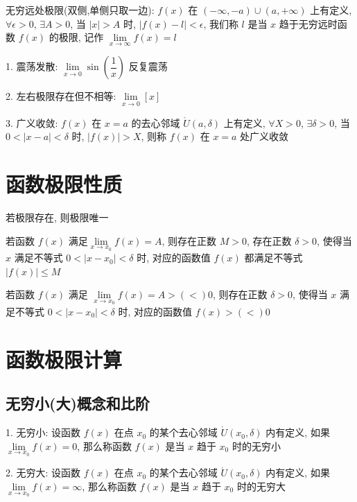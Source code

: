 \begin{definition}[无穷远极限]
	无穷远处极限(双侧,单侧只取一边): $f(x)$ 在 $(-\infty,-a)\cup(a,+\infty)$ 上有定义, $\forall \epsilon>0$, $\exists A>0$, 当 $|x|>A$ 时, $|f(x)-l|<\epsilon$, 我们称 $l$ 是当 $x$ 趋于无穷远时函数 $f(x)$ 的极限, 记作 $\lim\limits_{x\to\infty}f(x)=l$
\end{definition}
\begin{definition}[极限发散]
	1. 震荡发散: $\lim\limits_{x\to 0}\sin(\dfrac{1}{x})$ 反复震荡

	2. 左右极限存在但不相等: $\lim\limits_{x\to 0}[x]$

	3. 广义收敛: $f(x)$ 在 $x=a$ 的去心邻域 $\mathring{U}(a,\delta)$ 上有定义, $\forall X>0$, $\exists \delta>0$, 当 $0<|x-a|<\delta$ 时, $|f(x)|>X$, 则称 $f(x)$ 在 $x=a$ 处广义收敛
\end{definition}
\section{函数极限性质}
\begin{property}[唯一性]
	若极限存在, 则极限唯一
\end{property}

\begin{property}[局部有界性]
	若函数 $f(x)$ 满足$\lim\limits_{x\to x_{0}}f(x)=A$, 则存在正数 $M>0$, 存在正数 $\delta>0$, 使得当 $x$ 满足不等式 $0<|x-x_{0}|<\delta$ 时, 对应的函数值 $f(x)$ 都满足不等式 $|f(x)|\leq M$
\end{property}

\begin{property}[局部保号性]
	若函数 $f(x)$ 满足 $\lim\limits_{x\to x_{0}}f(x)=A>(<)0$, 则存在正数 $\delta>0$, 使得当 $x$ 满足不等式 $0<|x-x_{0}|<\delta$ 时, 对应的函数值 $f(x)>(<)0$
\end{property}

\section{函数极限计算}
\subsection{无穷小(大)概念和比阶}
\begin{definition}[无穷小(大)]
	1. 无穷小: 设函数 $f(x)$ 在点 $x_{0}$ 的某个去心邻域 $\mathring{U}(x_{0},\delta)$ 内有定义, 如果 $\lim\limits_{x\to x_{0}}f(x)=0$, 那么称函数 $f(x)$ 是当 $x$ 趋于 $x_{0}$ 时的无穷小

	2. 无穷大: 设函数 $f(x)$ 在点 $x_{0}$ 的某个去心邻域 $\mathring{U}(x_{0},\delta)$ 内有定义, 如果 $\lim\limits_{x\to x_{0}}f(x)=\infty$, 那么称函数 $f(x)$ 是当 $x$ 趋于 $x_{0}$ 时的无穷大
\end{definition}


